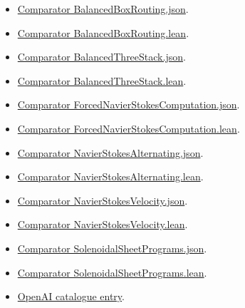 \documentclass[11pt]{article}
\begin{document}
\begin{itemize}
\item \href{https://github.com/openai/math/blob/adc7f1241b42e322a6451854ab7e4b4c146bf78a/lean/ComparatorChallenges/BalancedBoxRouting.json}{Comparator BalancedBoxRouting.json}.
\item \href{https://github.com/openai/math/blob/adc7f1241b42e322a6451854ab7e4b4c146bf78a/lean/ComparatorChallenges/BalancedBoxRouting.lean}{Comparator BalancedBoxRouting.lean}.
\item \href{https://github.com/openai/math/blob/adc7f1241b42e322a6451854ab7e4b4c146bf78a/lean/ComparatorChallenges/BalancedThreeStack.json}{Comparator BalancedThreeStack.json}.
\item \href{https://github.com/openai/math/blob/adc7f1241b42e322a6451854ab7e4b4c146bf78a/lean/ComparatorChallenges/BalancedThreeStack.lean}{Comparator BalancedThreeStack.lean}.
\item \href{https://github.com/openai/math/blob/adc7f1241b42e322a6451854ab7e4b4c146bf78a/lean/ComparatorChallenges/ForcedNavierStokesComputation.json}{Comparator ForcedNavierStokesComputation.json}.
\item \href{https://github.com/openai/math/blob/adc7f1241b42e322a6451854ab7e4b4c146bf78a/lean/ComparatorChallenges/ForcedNavierStokesComputation.lean}{Comparator ForcedNavierStokesComputation.lean}.
\item \href{https://github.com/openai/math/blob/adc7f1241b42e322a6451854ab7e4b4c146bf78a/lean/ComparatorChallenges/NavierStokesAlternating.json}{Comparator NavierStokesAlternating.json}.
\item \href{https://github.com/openai/math/blob/adc7f1241b42e322a6451854ab7e4b4c146bf78a/lean/ComparatorChallenges/NavierStokesAlternating.lean}{Comparator NavierStokesAlternating.lean}.
\item \href{https://github.com/openai/math/blob/adc7f1241b42e322a6451854ab7e4b4c146bf78a/lean/ComparatorChallenges/NavierStokesVelocity.json}{Comparator NavierStokesVelocity.json}.
\item \href{https://github.com/openai/math/blob/adc7f1241b42e322a6451854ab7e4b4c146bf78a/lean/ComparatorChallenges/NavierStokesVelocity.lean}{Comparator NavierStokesVelocity.lean}.
\item \href{https://github.com/openai/math/blob/adc7f1241b42e322a6451854ab7e4b4c146bf78a/lean/ComparatorChallenges/SolenoidalSheetPrograms.json}{Comparator SolenoidalSheetPrograms.json}.
\item \href{https://github.com/openai/math/blob/adc7f1241b42e322a6451854ab7e4b4c146bf78a/lean/ComparatorChallenges/SolenoidalSheetPrograms.lean}{Comparator SolenoidalSheetPrograms.lean}.
\item \href{https://github.com/openai/math/blob/adc7f1241b42e322a6451854ab7e4b4c146bf78a/CONTENTS.md}{OpenAI catalogue entry}.
\end{itemize}
\end{document}
